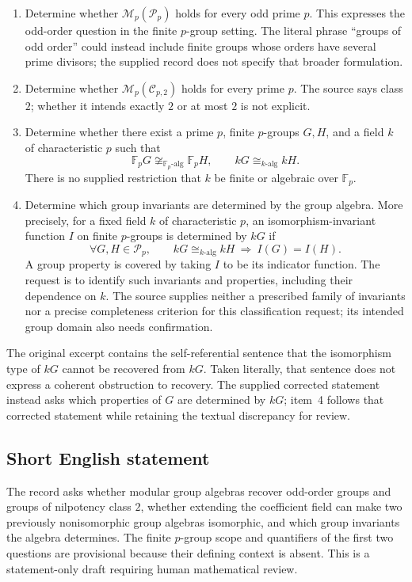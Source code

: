 \documentclass[11pt]{article}
\newcommand{\F}{\mathbb{F}}
\begin{document}
\begin{enumerate}
\item Determine whether \(\mathcal M_p(\mathcal P_p)\) holds for every odd prime \(p\). This expresses the odd-order question in the finite \(p\)-group setting. The literal phrase ``groups of odd order'' could instead include finite groups whose orders have several prime divisors; the supplied record does not specify that broader formulation.
\item Determine whether \(\mathcal M_p(\mathcal C_{p,2})\) holds for every prime \(p\). The source says class \(2\); whether it intends exactly \(2\) or at most \(2\) is not explicit.
\item Determine whether there exist a prime \(p\), finite \(p\)-groups \(G,H\), and a field \(k\) of characteristic \(p\) such that
\[
\F_pG\not\cong_{\F_p\text{-alg}}\F_pH,
\qquad
kG\cong_{k\text{-alg}}kH.
\]
There is no supplied restriction that \(k\) be finite or algebraic over \(\F_p\).
\item Determine which group invariants are determined by the group algebra. More precisely, for a fixed field \(k\) of characteristic \(p\), an isomorphism-invariant function \(I\) on finite \(p\)-groups is determined by \(kG\) if
\[
\forall G,H\in\mathcal P_p,\qquad
kG\cong_{k\text{-alg}}kH\ \Longrightarrow\ I(G)=I(H).
\]
A group property is covered by taking \(I\) to be its indicator function. The request is to identify such invariants and properties, including their dependence on \(k\). The source supplies neither a prescribed family of invariants nor a precise completeness criterion for this classification request; its intended group domain also needs confirmation.
\end{enumerate}

The original excerpt contains the self-referential sentence that the isomorphism type of \(kG\) cannot be recovered from \(kG\). Taken literally, that sentence does not express a coherent obstruction to recovery. The supplied corrected statement instead asks which properties of \(G\) are determined by \(kG\); item~4 follows that corrected statement while retaining the textual discrepancy for review.
\subsection{Short English statement}
The record asks whether modular group algebras recover odd-order groups and groups of nilpotency class \(2\), whether extending the coefficient field can make two previously nonisomorphic group algebras isomorphic, and which group invariants the algebra determines. The finite \(p\)-group scope and quantifiers of the first two questions are provisional because their defining context is absent. This is a statement-only draft requiring human mathematical review.
\end{document}
